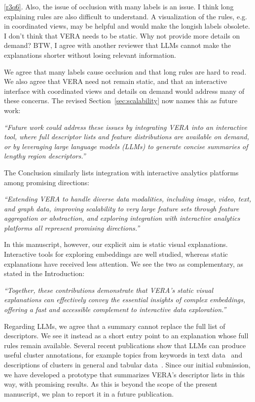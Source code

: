 \documentclass[11pt]{article}
\newcounter{rtaskno}
\newcommand{\rtask}[1]{\refstepcounter{rtaskno}\label{#1}}
\newcommand{\reviewc}[2]{\begin{leftbar}\noindent\rtask{#1}\ref{#1}. #2\end{leftbar}\vspace*{-4mm}}
\newcommand{\answer}[1]{\noindent #1\par\vspace{2mm}}
\newcommand{\copyquote}[1]{\vspace{1mm} {\itshape ``#1''}\vspace{1mm}}
\newlength{\leftbarwidth}
\newlength{\leftbarsep}
\renewenvironment{leftbar}{%
    \def\FrameCommand{{\color{black}{\vrule width \leftbarwidth\relax\hspace {\leftbarsep}}}}%
    \MakeFramed {\advance \hsize -\width \FrameRestore }%
}{\endMakeFramed}
\begin{document}
\reviewc{r3q6}{Also, the issue of occlusion with many labels is an issue. I think long explaining rules are also difficult to understand. A visualization of the rules, e.g. in coordinated views, may be helpful and would make the longish labels obsolete. I don't think that VERA needs to be static. Why not provide more details on demand? BTW, I agree with another reviewer that LLMs cannot make the explanations shorter without losing relevant information.}

\answer{%
We agree that many labels cause occlusion and that long rules are hard to read. We also agree that VERA need not remain static, and that an interactive interface with coordinated views and details on demand would address many of these concerns. The revised Section~\ref{sec:scalability} now names this as future work:

\copyquote{Future work could address these issues by integrating VERA into an interactive tool, where full descriptor lists and feature distributions are available on demand, or by leveraging large language models (LLMs) to generate concise summaries of lengthy region descriptors.}

The Conclusion similarly lists integration with interactive analytics platforms among promising directions:

\copyquote{Extending VERA to handle diverse data modalities, including image, video, text, and graph data, improving scalability to very large feature sets through feature aggregation or abstraction, and exploring integration with interactive analytics platforms all represent promising directions.}

In this manuscript, however, our explicit aim is static visual explanations. Interactive tools for exploring embeddings are well studied, whereas static explanations have received less attention. We see the two as complementary, as stated in the Introduction:

\copyquote{Together, these contributions demonstrate that VERA's static visual explanations can effectively convey the essential insights of complex embeddings, offering a fast and accessible complement to interactive data exploration.}

Regarding LLMs, we agree that a summary cannot replace the full list of descriptors. We see it instead as a short entry point to an explanation whose full rules remain available. Several recent publications show that LLMs can produce useful cluster annotations, for example topics from keywords in text data~\citep{Kozlowski2024,Piper2025} and descriptions of clusters in general and tabular data~\citep{Preiss2024,Hong2025,Buchmuller2026}.
Since our initial submission, we have developed a prototype that summarizes VERA's descriptor lists in this way, with promising results. As this is beyond the scope of the present manuscript, we plan to report it in a future publication.
}
\end{document}
